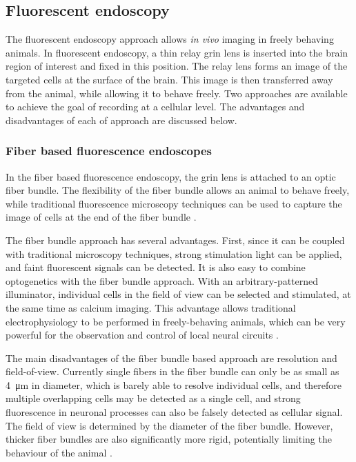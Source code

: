 \subsection{Fluorescent endoscopy}

The fluorescent endoscopy approach allows \textit{in vivo} imaging in freely behaving animals. In fluorescent endoscopy, a thin relay \gls{grin} lens is inserted into the brain region of interest and fixed in this position. The relay lens forms an image of the targeted cells at the surface of the brain. This image is then transferred away from the animal, while allowing it to behave freely. Two approaches are available to achieve the goal of recording at a cellular level. The advantages and disadvantages of each of approach are discussed below. 

\subsubsection{Fiber based fluorescence endoscopes}
In the fiber based fluorescence endoscopy, the \gls{grin} lens is attached to an optic fiber bundle. The flexibility of the fiber bundle allows an animal to behave freely, while traditional fluorescence microscopy techniques can be used to capture the image of cells at the end of the fiber bundle \citep{flusberg08}. 

The fiber bundle approach has several advantages. First, since it can be coupled with traditional microscopy techniques, strong stimulation light can be applied, and faint fluorescent signals can be detected. It is also easy to combine optogenetics with the fiber bundle approach. With an arbitrary-patterned illuminator, individual cells in the field of view can be selected and stimulated, at the same time as calcium imaging. This advantage allows traditional electrophysiology to be performed in freely-behaving animals, which can be very powerful for the observation and control of local neural circuits \citep{szabo14}.

The main disadvantages of the fiber bundle based approach are resolution and field-of-view. Currently single fibers in the fiber bundle can only be as small as \SI{4}{\um} in diameter, which is barely able to resolve individual cells, and therefore multiple overlapping cells may be detected as a single cell, and strong fluorescence in neuronal processes can also be falsely detected as cellular signal. The field of view is determined by the diameter of the fiber bundle. However, thicker fiber bundles are also significantly more rigid, potentially limiting the behaviour of the animal \citep{yang17}. 


